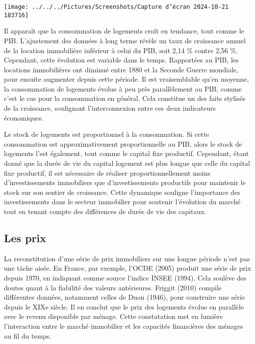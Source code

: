 \documentclass[a4paper, 12pt]{report}
\begin{document}
\begin{center}
	\texttt{[image: ../../../Pictures/Screenshots/Capture d'écran 2024-10-21 183716]}
\end{center}

Il apparaît que la consommation de logements croît en tendance, tout comme le PIB. L'ajustement des données à long terme révèle un taux de croissance annuel de la location immobilière inférieur à celui du PIB, soit 2,14 \% contre 2,56 \%. Cependant, cette évolution est variable dans le temps. Rapportées au PIB, les locations immobilières ont diminué entre 1880 et la Seconde Guerre mondiale, pour ensuite augmenter depuis cette période. Il est vraisemblable qu'en moyenne, la consommation de logements évolue à peu près parallèlement au PIB, comme c'est le cas pour la consommation en général. Cela constitue un des faits stylisés de la croissance, soulignant l'interconnexion entre ces deux indicateurs économiques.

Le stock de logements est proportionnel à la consommation. Si cette consommation est approximativement proportionnelle au PIB, alors le stock de logements l'est également, tout comme le capital fixe productif. Cependant, étant donné que la durée de vie du capital logement est plus longue que celle du capital fixe productif, il est nécessaire de réaliser proportionnellement moins d'investissements immobiliers que d'investissements productifs pour maintenir le stock sur son sentier de croissance. Cette dynamique souligne l'importance des investissements dans le secteur immobilier pour soutenir l'évolution du marché tout en tenant compte des différences de durée de vie des capitaux.

\subsection{Les prix}

La reconstitution d'une série de prix immobiliers sur une longue période n'est pas une tâche aisée. En France, par exemple, l'OCDE (2005) produit une série de prix depuis 1970, en indiquant comme source l'indice INSEE (1994). Cela soulève des doutes quant à la fiabilité des valeurs antérieures. Friggit (2010) compile différentes données, notamment celles de Duon (1946), pour construire une série depuis le XIXe siècle. Il en conclut que le prix des logements évolue en parallèle avec le revenu disponible par ménage. Cette constatation met en lumière l'interaction entre le marché immobilier et les capacités financières des ménages au fil du temps.
\end{document}
